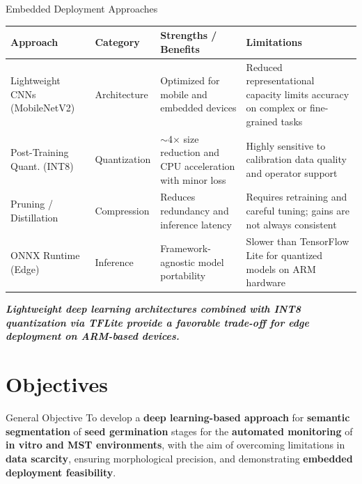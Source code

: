 \documentclass[aspectratio=169]{beamer}
\let\oldcite\cite %
\renewcommand{\cite}[1]{{\tiny\oldcite{#1}}}
\begin{document}
\begin{frame}{Embedded Deployment Approaches}
    \begin{table}[H]
    \centering
    \tiny
    \setlength{\tabcolsep}{2pt}
    \begin{tabular}{@{}p{3.5cm}p{1.6cm}p{3.2cm}p{3.5cm}@{}}
    \toprule
    \textbf{Approach} & \textbf{Category} & \textbf{Strengths / Benefits} & \textbf{Limitations} \\
    \midrule
    Lightweight CNNs (MobileNetV2) &
    Architecture &
    Optimized for mobile and embedded devices \cite{sandler2018mobilenetv2} &
    Reduced representational capacity limits accuracy on complex or fine-grained tasks \cite{mehta2018espnet} \\
    \addlinespace[2pt]
    Post-Training Quant. (INT8) &
    Quantization &
    $\sim$4× size reduction and CPU acceleration with minor loss \cite{jacob2018quantization} &
    Highly sensitive to calibration data quality and operator support \cite{gholami2021survey} \\
    \addlinespace[2pt]
    Pruning / Distillation &
    Compression &
    Reduces redundancy and inference latency \cite{li2020pruning} &
    Requires retraining and careful tuning; gains are not always consistent \cite{molchanov2019importance} \\
    \addlinespace[2pt]
    ONNX Runtime (Edge) &
    Inference &
    Framework-agnostic model portability \cite{chen2022onnxarm} &
    Slower than TensorFlow Lite for quantized models on ARM hardware \cite{chen2022onnxarm} \\
    \bottomrule
    \end{tabular}
    \end{table}
    
    \vspace{0.3cm}
    \small
    \textit{\textbf{Lightweight deep learning architectures combined with INT8 quantization via TFLite provide a favorable trade-off for edge deployment on ARM-based devices.}}
\end{frame}

\section{Objectives}

\begin{frame}{General Objective}
    \centering
    To develop a \textbf{deep learning-based approach} for \textbf{semantic segmentation} of \textbf{seed germination} stages for the \textbf{automated monitoring} of \textbf{in vitro and MST environments}, with the aim of overcoming limitations in \textbf{data scarcity}, ensuring morphological precision, and demonstrating \textbf{embedded deployment feasibility}.
\end{frame}
\end{document}
